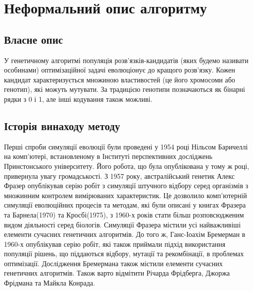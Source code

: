 \documentclass[a4paper, 12pt]{article}
\author{Скибицький Нікіта}
\date{\today}
\numberwithin{equation}{section}
\begin{document}

\tableofcontents

\section{Неформальний опис алгоритму}

\subsection{Власне опис}

У генетичному алгоритмі популяція розв'язків-кандидатів (яких будемо називати особинами) оптимізаційної задачі еволюціонує до кращого розв'язку. Кожен кандидат характеризується множиною властивостей (це його хромосоми або генотип), які можуть мутувати. За традицією генотипи позначаються як бінарні рядки з 0 і 1, але інші кодування також можливі.

\subsection{Історія винаходу методу}

Перші спроби симуляції еволюції були проведені у 1954 році Нільсом Баричеллі на комп'ютері, встановленому в Інституті перспективних досліджень Принстонського університету. Його робота, що була опублікована у тому ж році, привернула увагу громадськості. З 1957 року,  австралійський генетик Алекс Фразер опублікував серію робіт з симуляції штучного відбору серед організмів з множинним контролем вимірюваних характеристик. Це дозволило комп'ютерній симуляції еволюційних процесів та методам, які були описані у книгах Фразера та Барнела(1970) та Кросбі(1975), з 1960-х років стати більш розповсюдженим видом діяльності серед біологів. Симуляції Фразера містили усі найважливіші елементи сучасних генетичних алгоритмів. До того ж, Ганс-Іоахім Бремерман в 1960-х опублікував серію робіт, які також приймали підхід використання популяції рішень, що піддаються відбору, мутації та рекомбінації, в проблемах оптимізації. Дослідження Бремермана також містили елементи сучасних генетичних алгоритмів. Також варто відмітити Річарда Фрідберга, Джоржа Фрідмана та Майкла Конрада. \medskip
\end{document}
